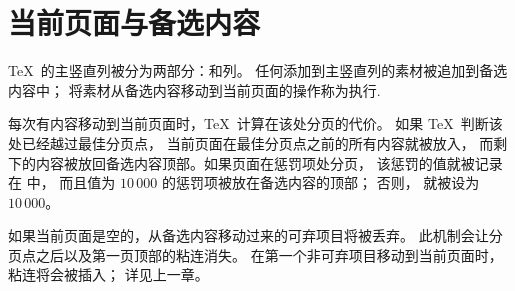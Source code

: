 \documentclass{book}
\begin{document}
\section{当前页面与备选内容}

\TeX\ 的主竖直列被分为两部分：和列。
任何添加到主竖直列的素材被追加到备选内容中；
将素材从备选内容移动到当前页面的操作称为执行.

每次有内容移动到当前页面时，\TeX\ 计算在该处分页的代价。
如果 \TeX\ 判断该处已经越过最佳分页点，
当前页面在最佳分页点之前的所有内容就被放入，
\altt 
而剩下的内容被放回备选内容顶部。如果页面在惩罚项处分页，
\label{break:penalty}%
该惩罚的值就被记录在  中，
而且值为 $10\,000$ 的惩罚项被放在备选内容的顶部；
否则， 就被设为~$10\,000$。

如果当前页面是空的，从备选内容移动过来的可弃项目将被丢弃。
此机制会让分页点之后以及第一页顶部的粘连消失。
在第一个非可弃项目移动到当前页面时， 粘连将会被插入；
详见上一章。
\end{document}
